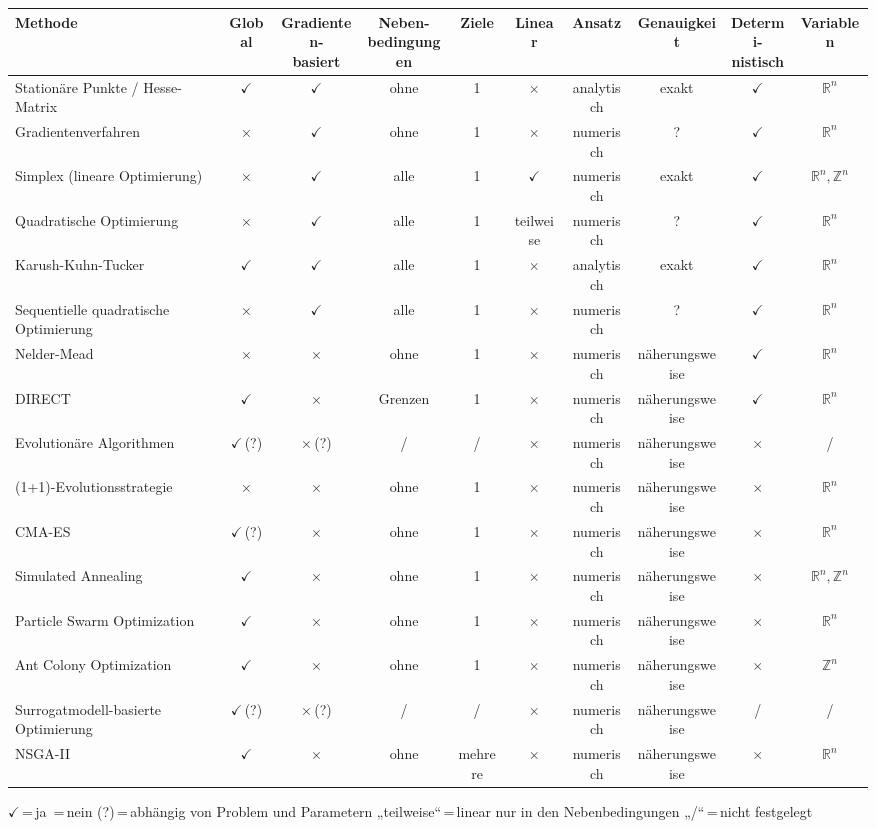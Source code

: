 \documentclass[10pt,a4paper]{article}
\newcommand{\jc}{{\color{sub}\boldmath$\checkmark$}}   %
\newcommand{\nc}{{\color{grau}\boldmath$\times$}}      %
\begin{document}
\footnotesize
\setlength{\tabcolsep}{3pt}
\renewcommand{\arraystretch}{1.2}
\begin{center}
\begin{tabular}{|>{\raggedright\arraybackslash}p{2.9cm}|c|c|c|c|c|c|c|c|c|}
\hline
\rowcolor{head!10}
\textbf{Methode} & \textbf{Global} & \shortstack{\textbf{Gradienten-}\\\textbf{basiert}} & \shortstack{\textbf{Neben-}\\\textbf{bedingungen}} & \textbf{Ziele} & \textbf{Linear} & \textbf{Ansatz} & \textbf{Genauigkeit} & \shortstack{\textbf{Determi-}\\\textbf{nistisch}} & \textbf{Variablen}\\
\hline
Stationäre Punkte / Hesse-Matrix & \jc & \jc & ohne & 1 & \nc & analytisch & exakt & \jc & $\mathbb{R}^n$\\
\hline
Gradientenverfahren & \nc & \jc & ohne & 1 & \nc & numerisch & ? & \jc & $\mathbb{R}^n$\\
\hline
Simplex (lineare Optimierung) & \nc & \jc & alle & 1 & \jc & numerisch & exakt & \jc & $\mathbb{R}^n,\mathbb{Z}^n$\\
\hline
Quadratische Optimierung & \nc & \jc & alle & 1 & teilweise & numerisch & ? & \jc & $\mathbb{R}^n$\\
\hline
Karush-Kuhn-Tucker & \jc & \jc & alle & 1 & \nc & analytisch & exakt & \jc & $\mathbb{R}^n$\\
\hline
Sequentielle quadratische Optimierung & \nc & \jc & alle & 1 & \nc & numerisch & ? & \jc & $\mathbb{R}^n$\\
\hline
Nelder-Mead & \nc & \nc & ohne & 1 & \nc & numerisch & näherungsweise & \jc & $\mathbb{R}^n$\\
\hline
DIRECT & \jc & \nc & Grenzen & 1 & \nc & numerisch & näherungsweise & \jc & $\mathbb{R}^n$\\
\hline
Evolutionäre Algorithmen & \jc\,(?) & \nc\,(?) & / & / & \nc & numerisch & näherungsweise & \nc & /\\
\hline
(1+1)-Evolutionsstrategie & \nc & \nc & ohne & 1 & \nc & numerisch & näherungsweise & \nc & $\mathbb{R}^n$\\
\hline
CMA-ES & \jc\,(?) & \nc & ohne & 1 & \nc & numerisch & näherungsweise & \nc & $\mathbb{R}^n$\\
\hline
Simulated Annealing & \jc & \nc & ohne & 1 & \nc & numerisch & näherungsweise & \nc & $\mathbb{R}^n,\mathbb{Z}^n$\\
\hline
Particle Swarm Optimization & \jc & \nc & ohne & 1 & \nc & numerisch & näherungsweise & \nc & $\mathbb{R}^n$\\
\hline
Ant Colony Optimization & \jc & \nc & ohne & 1 & \nc & numerisch & näherungsweise & \nc & $\mathbb{Z}^n$\\
\hline
Surrogatmodell-basierte Optimierung & \jc\,(?) & \nc\,(?) & / & / & \nc & numerisch & näherungsweise & / & /\\
\hline
NSGA-II & \jc & \nc & ohne & mehrere & \nc & numerisch & näherungsweise & \nc & $\mathbb{R}^n$\\
\hline
\end{tabular}
\end{center}
\vspace{-2pt}
{\color{grau}\footnotesize \jc\,=\,ja \quad \nc\,=\,nein \quad (?)\,=\,abhängig von Problem und Parametern \quad „teilweise``\,=\,linear nur in den Nebenbedingungen \quad „/``\,=\,nicht festgelegt}
\end{document}
